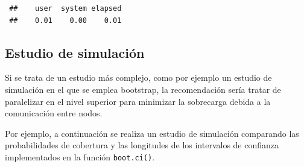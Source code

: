 \documentclass[
  spanish,
  10pt,
]{book}
\theoremstyle{break}
\theoremstyle{nonumberplain}
\begin{document}
\begin{verbatim}
 ##    user  system elapsed 
 ##    0.01    0.00    0.01
\end{verbatim}

\subsection{Estudio de simulación}\label{estudio-sim-boot}

Si se trata de un estudio más complejo, como por ejemplo un estudio de simulación en el que se emplea bootstrap, la recomendación sería tratar de paralelizar en el nivel superior para minimizar la sobrecarga debida a la comunicación entre nodos.

Por ejemplo, a continuación se realiza un estudio de simulación comparando las probabilidades de cobertura y las longitudes de los intervalos de confianza implementados en la función \texttt{boot.ci()}.
\end{document}
